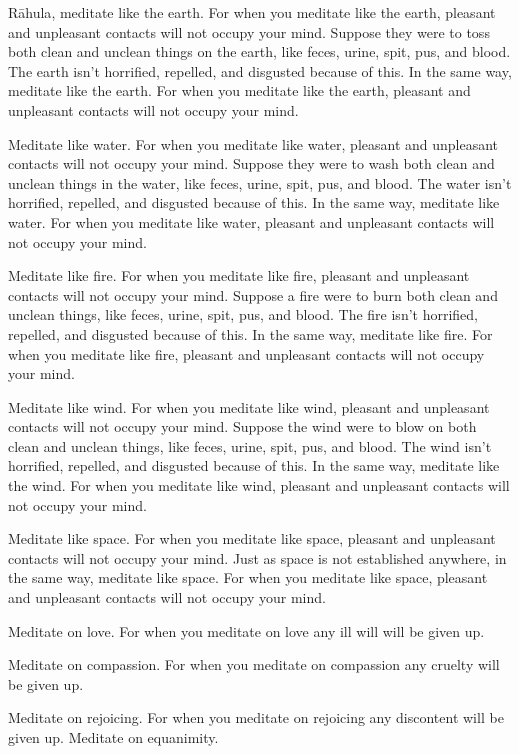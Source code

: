 \documentclass[12pt,openany]{book}%
\begin{document}
\textsanskrit{Rāhula}, meditate like the earth. For when you meditate like the earth, pleasant and unpleasant contacts will not occupy your mind. Suppose they were to toss both clean and unclean things on the earth, like feces, urine, spit, pus, and blood. The earth isn’t horrified, repelled, and disgusted because of this. In the same way, meditate like the earth. For when you meditate like the earth, pleasant and unpleasant contacts will not occupy your mind. 

Meditate like water. For when you meditate like water, pleasant and unpleasant contacts will not occupy your mind. Suppose they were to wash both clean and unclean things in the water, like feces, urine, spit, pus, and blood. The water isn’t horrified, repelled, and disgusted because of this. In the same way, meditate like water. For when you meditate like water, pleasant and unpleasant contacts will not occupy your mind. 

Meditate like fire. For when you meditate like fire, pleasant and unpleasant contacts will not occupy your mind. Suppose a fire were to burn both clean and unclean things, like feces, urine, spit, pus, and blood. The fire isn’t horrified, repelled, and disgusted because of this. In the same way, meditate like fire. For when you meditate like fire, pleasant and unpleasant contacts will not occupy your mind. 

Meditate like wind. For when you meditate like wind, pleasant and unpleasant contacts will not occupy your mind. Suppose the wind were to blow on both clean and unclean things, like feces, urine, spit, pus, and blood. The wind isn’t horrified, repelled, and disgusted because of this. In the same way, meditate like the wind. For when you meditate like wind, pleasant and unpleasant contacts will not occupy your mind. 

Meditate like space. For when you meditate like space, pleasant and unpleasant contacts will not occupy your mind. Just as space is not established anywhere, in the same way, meditate like space. For when you meditate like space, pleasant and unpleasant contacts will not occupy your mind. 

Meditate on love. For when you meditate on love any ill will will be given up. 

Meditate on compassion. For when you meditate on compassion any cruelty will be given up. 

Meditate on rejoicing. For when you meditate on rejoicing any discontent will be given up. Meditate on equanimity. 
\end{document}
